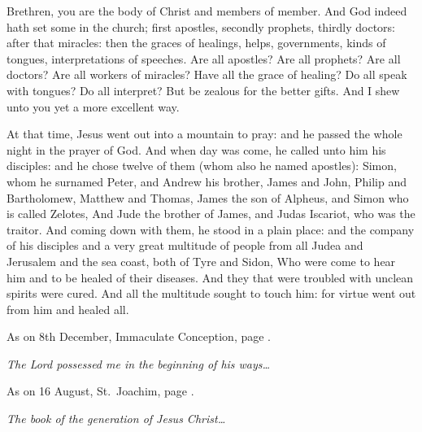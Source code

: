 \bigskip




Brethren, you are the body of Christ and members of member.
And God indeed hath set some in the church; first apostles,
secondly prophets, thirdly doctors: after that miracles: then the graces
of healings, helps, governments, kinds of tongues, interpretations of
speeches.
Are all apostles? Are all prophets? Are all doctors?
Are all workers of miracles? Have all the grace of healing?  Do
all speak with tongues? Do all interpret?
But be zealous for the better gifts. And I shew unto you yet a
more excellent way.



At that time, Jesus went out into a
mountain to pray: and he passed the whole night in the prayer of God.
And when day was come, he called unto him his disciples: and he
chose twelve of them (whom also he named apostles):
Simon, whom he surnamed Peter, and Andrew his brother, James and
John, Philip and Bartholomew,
Matthew and Thomas, James the son of Alpheus, and Simon who is
called Zelotes,
And Jude the brother of James, and Judas Iscariot, who was the
traitor.
And coming down with them, he stood in a plain place: and the
company of his disciples and a very great multitude of people from all
Judea and Jerusalem and the sea coast, both of Tyre and Sidon,
Who were come to hear him and to be healed of their diseases. And
they that were troubled with unclean spirits were cured.
And all the multitude sought to touch him: for virtue went out
from him and healed all.


\bigskip




As on 8th December, Immaculate Conception, page \pageref{Ep.immac}.

\emph{The Lord possessed me in the beginning of his ways\ldots} 


As on 16 August, St.~Joachim, page \pageref{Go.joachim}.

\emph{The book of the generation of Jesus Christ\ldots}

\bigskip

